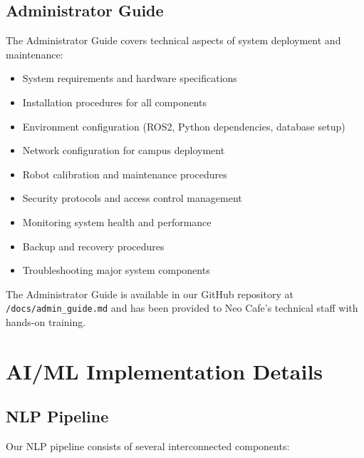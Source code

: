 \documentclass[12pt]{article}
\begin{document}
\subsection{Administrator Guide}
The Administrator Guide covers technical aspects of system deployment and maintenance:
\begin{itemize}
    \item System requirements and hardware specifications
    \item Installation procedures for all components
    \item Environment configuration (ROS2, Python dependencies, database setup)
    \item Network configuration for campus deployment
    \item Robot calibration and maintenance procedures
    \item Security protocols and access control management
    \item Monitoring system health and performance
    \item Backup and recovery procedures
    \item Troubleshooting major system components
\end{itemize}

The Administrator Guide is available in our GitHub repository at \texttt{/docs/admin\_guide.md} and has been provided to Neo Cafe's technical staff with hands-on training.

\section{AI/ML Implementation Details}

\subsection{NLP Pipeline}

Our NLP pipeline consists of several interconnected components:
\end{document}
